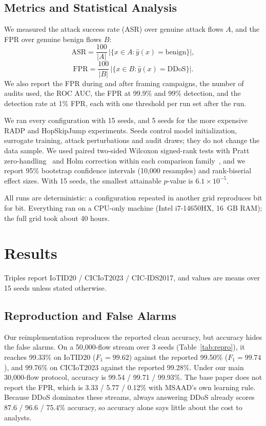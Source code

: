 \documentclass[conference]{IEEEtran}
\begin{document}
\subsection{Metrics and Statistical Analysis}
We measured the attack success rate (ASR) over genuine attack flows $A$, and
the FPR over genuine benign flows $B$:
\begin{equation}
\mathrm{ASR} = \frac{100}{\lvert A\rvert}\,\bigl\lvert\{x\in A:\hat y(x)=\mathrm{benign}\}\bigr\rvert ,
\label{eq:asr}
\end{equation}
\begin{equation}
\mathrm{FPR} = \frac{100}{\lvert B\rvert}\,\bigl\lvert\{x\in B:\hat y(x)=\mathrm{DDoS}\}\bigr\rvert .
\label{eq:fpr}
\end{equation}
We also report the FPR during and after framing campaigns, the number of audits
used, the ROC AUC, the FPR at 99.9\% and 99\% detection, and the detection rate
at 1\% FPR, each with one threshold per run set after the run.

We ran every configuration with 15 seeds, and 5 seeds for the more expensive
RADP and HopSkipJump experiments. Seeds control model initialization, surrogate
training, attack perturbations and audit draws; they do not change the data
sample. We used paired two-sided Wilcoxon signed-rank tests with Pratt
zero-handling~\cite{wilcoxon1945} and Holm correction within each comparison
family~\cite{holm1979}, and we report 95\% bootstrap confidence intervals
(10{,}000 resamples) and rank-biserial effect sizes. With 15 seeds, the
smallest attainable $p$-value is $6.1 \times 10^{-5}$.

All runs are deterministic: a configuration repeated in another grid reproduces
bit for bit. Everything ran on a CPU-only machine (Intel i7-14650HX, 16~GB RAM);
the full grid took about 40 hours.

\section{Results}\label{sec:results}
Triples report IoTID20 / CICIoT2023 / CIC-IDS2017, and values are means over 15
seeds unless stated otherwise.

\subsection{Reproduction and False Alarms}
Our reimplementation reproduces the reported clean accuracy, but accuracy hides
the false alarms. On a 50{,}000-flow stream over 3 seeds
(Table~\ref{tab:repro}), it reaches 99.33\% on IoTID20 ($F_1 = 99.62$) against
the reported 99.50\% ($F_1 = 99.74$), and 99.76\% on CICIoT2023 against the
reported 99.28\%. Under our main 30{,}000-flow protocol, accuracy is 99.54 /
99.71 / 99.93\%. The base paper does not report the FPR, which is 3.33 / 5.77 /
0.12\% with MSAAD's own learning rule. Because DDoS dominates these streams,
always answering DDoS already scores 87.6 / 96.6 / 75.4\% accuracy, so accuracy
alone says little about the cost to analysts.
\end{document}
